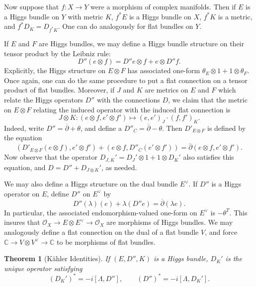 \documentclass[letterpaper, 12pt]{article}
\newcommand{\C}{\mathbb{C}}
\newtheorem{theorem}{Theorem}
\theoremstyle{definition}
\newcommand{\del}{\partial}
\newcommand{\delbar}{\overline{\del}}
\begin{document}
Now suppose that $f: X \to Y$ were a morphism of complex manifolds. Then if $E$ is a Higgs bundle on $Y$ with metric $K$, $f^* E$ is a Higgs bundle on $X$, $f^* K$ is a metric, and $f^* D_K = D_{f^* K}$. One can do analogously for flat bundles on $Y$.

If $E$ and $F$ are Higgs bundles, we may define a Higgs bundle structure on their tensor product by the Leibniz rule:
\begin{equation}
    D''(e \otimes f) = D''e \otimes f + e \otimes D''f.
\end{equation}
Explicitly, the Higgs structure on $E \otimes F$ has associated one-form $\theta_E \otimes 1 + 1 \otimes \theta_F$. Once again, one can do the same procedure to put a flat connection on a tensor product of flat bundles. Moreover, if $J$ and $K$ are metrics on $E$ and $F$ which relate the Higgs operators $D''$ with the connections $D$, we claim that the metric on $E \otimes F$ relating the induced operator with the induced flat connection is
\begin{equation}
    J \otimes K: (e \otimes f, e' \otimes f') \mapsto (e, e')_J \cdot (f, f')_K.
\end{equation}
Indeed, write $D'' = \delbar + \theta$, and define a $D''_C = \delbar - \theta$. Then $D'_{E \otimes F}$ is defined by the equation
\begin{equation}
    (D'_{E \otimes F}(e \otimes f), e' \otimes f') + (e \otimes f, D''_C(e' \otimes f')) = \delbar(e \otimes f, e' \otimes f').
\end{equation}
Now observe that the operator $D_{J, K}' = D_J' \otimes 1 + 1 \otimes D_K'$ also satisfies this equation, and $D = D'' + D_{J \otimes K}'$, as needed.

We may also define a Higgs structure on the dual bundle $E^\vee$. If $D''$ is a Higgs operator on $E$, define $D''$ on $E^\vee$ by
\begin{equation}
    D''(\lambda)(e) + \lambda(D''e) = \delbar(\lambda e).
\end{equation}
In particular, the associated endomorphism-valued one-form on $E^\vee$ is $-\theta^T$. This insures that $\mathcal{O}_X \to E \otimes E^\vee \to \mathcal{O}_X$ are morphisms of Higgs bundles. We may analogously define a flat connection on the dual of a flat bundle $V$, and force $\C \to V \otimes V^\vee \to \C$ to be morphisms of flat bundles.

\begin{theorem}[K\"ahler Identities] \label{kahler-identities}
    If $(E, D'', K)$ is a Higgs bundle, $D_K'$ is the unique operator satisfying
    \begin{equation}
        (D_K')^* = -i[\Lambda, D''],\qquad (D'')^* = -i[\Lambda, D_K'].
    \end{equation}
\end{theorem}
\end{document}
